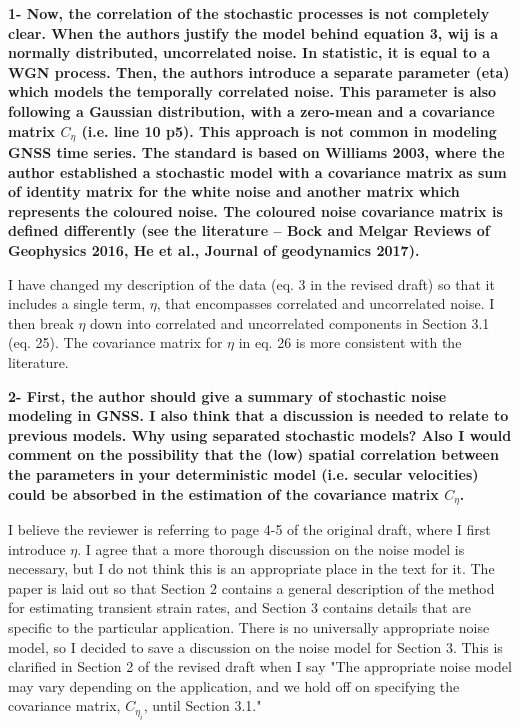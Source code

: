 \documentclass[10pt,a4paper]{letter}
\begin{document}
\begin{letter}{}
\textbf{1- Now, the correlation of the stochastic processes is not completely
clear. When the authors justify the model behind equation 3, wij is a
normally distributed, uncorrelated noise. In statistic, it is equal to
a WGN process. Then, the authors introduce a separate parameter (eta)
which models the temporally correlated noise. This parameter is also
following a Gaussian distribution, with a zero-mean and a covariance
matrix $C_{\eta}$ (i.e. line 10 p5). This approach is not common in
modeling GNSS time series. The standard is based on Williams 2003,
where the author established a stochastic model with a covariance
matrix as sum of identity matrix for the white noise and another
matrix which represents the coloured noise. The coloured noise
covariance matrix is defined differently (see the literature – Bock and
Melgar Reviews of Geophysics 2016, He et al., Journal of geodynamics
2017).}

I have changed my description of the data (eq. 3 in the revised draft)
so that it includes a single term, $\eta$, that encompasses correlated
and uncorrelated noise. I then break $\eta$ down into correlated and
uncorrelated components in Section 3.1 (eq. 25). The covariance matrix
for $\eta$ in eq. 26 is more consistent with the literature.

\textbf{2- First, the author should give a summary of stochastic noise
modeling in GNSS. I also think that a discussion is needed to relate
to previous models. Why using separated stochastic models? Also I
would comment on the possibility that the (low) spatial correlation
between the parameters in your deterministic model (i.e. secular
velocities) could be absorbed in the estimation of the covariance
matrix $C_{\eta}$.}

I believe the reviewer is referring to page 4-5 of the original draft,
where I first introduce $\eta$. I agree that a more thorough
discussion on the noise model is necessary, but I do not think this is
an appropriate place in the text for it. The paper is laid out so that
Section 2 contains a general description of the method for estimating
transient strain rates, and Section 3 contains details that are
specific to the particular application. There is no universally
appropriate noise model, so I decided to save a discussion on the
noise model for Section 3. This is clarified in Section 2 of the
revised draft when I say "The appropriate noise model may vary
depending on the application, and we hold off on specifying the
covariance matrix, $C_{\eta_i}$, until Section 3.1."


\end{letter}
\end{document}
